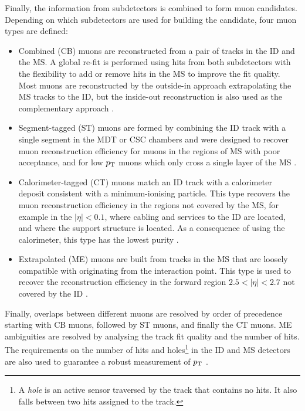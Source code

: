 Finally, the information from subdetectors is combined to form muon
candidates. Depending on which subdetectors are used for building the
candidate, four muon types are defined:
\begin{itemize}
\item Combined (CB) muons are reconstructed from a pair of tracks
in the ID and the MS. A global re-fit is performed using hits from 
both subdetectors with the flexibility to add or remove hits in the
MS to improve the fit quality. Most muons are reconstructed by the
outside-in approach extrapolating the MS tracks to the ID, but the
inside-out reconstruction is also used as the complementary approach 
\cite{Aad:2016jkr}.
\item Segment-tagged (ST) muons are formed by combining the ID track
with a single segment in the MDT or CSC chambers and were designed
to recover muon reconstruction efficiency for muons in the regions of
MS with poor acceptance, and for low $p_{\text{T}}$ muons which
only cross a single layer of the MS \cite{Aad:2016jkr}.
\item Calorimeter-tagged (CT) muons match an ID track with a 
calorimeter deposit consistent with a minimum-ionising particle.
This type recovers the muon reconstruction efficiency in the regions
not covered by the MS, for example in the $|\eta|<0.1$, where cabling
and services to the ID are located, and where the support structure
is located. As a consequence of using the calorimeter, this type has
the lowest purity \cite{Aad:2016jkr}.
\item Extrapolated (ME) muons are built from tracks in the MS that
are loosely compatible with originating from the interaction point.
This type is used to recover the reconstruction efficiency in the 
forward region $2.5 < |\eta| < 2.7$ not covered by the ID \cite{Aad:2016jkr}.
\end{itemize}
Finally, overlaps between different muons are resolved by order of
precedence starting with CB muons, followed by ST muons, and
finally the CT muons. ME ambiguities are resolved by analysing the
track fit quality and the number of hits.
The requirements on the number of hits and holes\footnote{A
\textit{hole} is an active sensor traversed by the
track that contains no hits. It also falls between two hits assigned to the track.}
in the ID and MS detectors are also used to guarantee a robust
measurement of $p_{\text{T}}$ \cite{Aad:2016jkr}.

